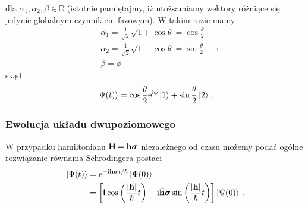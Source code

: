 \documentclass{myclass}
\begin{document}
dla \(\alpha_1,\alpha_2,\beta\in\mathbb{R}\) (istotnie pamiętajmy, iż utożsamiamy wektory różniące
się jedynie globalnym czynnikiem fazowym). W takim razie mamy
\begin{equation*}
    \begin{split}
        &\alpha_1 = \frac{1}{\sqrt{2}}\sqrt{1+\cos\theta} = \cos\frac{\theta}{2}\\
        &\alpha_2 = \frac{1}{\sqrt{2}}\sqrt{1-\cos\theta} = \sin\frac{\theta}{2}\\
        &\beta = \phi
    \end{split}\quad,
\end{equation*}
skąd
\begin{equation*}
        \ket{\Psi(t)} =\cos\frac{\theta}{2}\mathrm{e}^{\mathrm{i}\phi}\ket{1} + \sin\frac{\theta}{2}\ket{2}\,.
\end{equation*}

\subsubsection{Ewolucja układu dwupoziomowego}

W przypadku hamiltonianu \(\boldsymbol{\mathsf{H}}=\mathbf{h}\boldsymbol{\sigma}\) niezależnego od czasu możemy
podać ogólne rozwiązanie równania Schr\"{o}dingera postaci
\begin{equation*}
    \begin{split}
        \ket{\Psi(t)} &= \mathrm{e}^{-\mathrm{i}\mathbf{h}\boldsymbol{\sigma}t/\hbar}\ket{\Psi(0)} \\
        &= \left[\boldsymbol{\mathsf{I}}\cos\left(\frac{|\mathbf{h}|}{\hbar}t\right) - \mathrm{i} \mathbf{\hat{h}}\boldsymbol{\sigma}\sin\left(\frac{|\mathbf{h}|}{\hbar}t\right)\right]\ket{\Psi(0)}\,.
    \end{split}
\end{equation*}
\medskip
\end{document}
